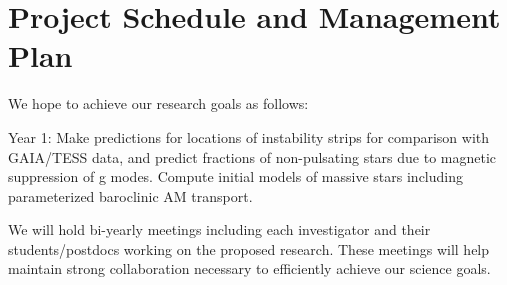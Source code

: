 \section{Project Schedule and Management Plan}

We hope to achieve our research goals as follows:

Year 1: Make predictions for locations of instability strips for comparison with GAIA/TESS data, and predict fractions of non-pulsating stars due to magnetic suppression of g modes. Compute initial models of massive stars including parameterized baroclinic AM transport.  

We will  hold bi-yearly meetings including each investigator and their students/postdocs working on the proposed research. These meetings will help maintain strong collaboration necessary to efficiently achieve our science goals.

